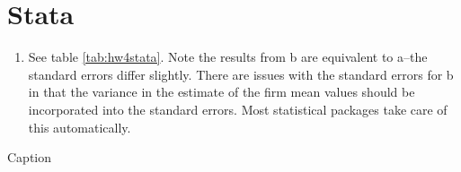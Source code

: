 \documentclass{article}
\begin{document}
\clearpage

\section{Stata}
\begin{enumerate}
    \item  See table \ref{tab:hw4stata}.  Note the results from b are equivalent to a--the standard errors differ slightly.  There are issues with the standard errors for b in that the variance in the estimate of the firm mean values should be incorporated into the standard errors.  Most statistical packages take care of this automatically.
\end{enumerate}

\begin{table}[h]
    \centering
    
    \caption{Caption}
    \label{tab:hw4stata}
\end{table}
\end{document}
